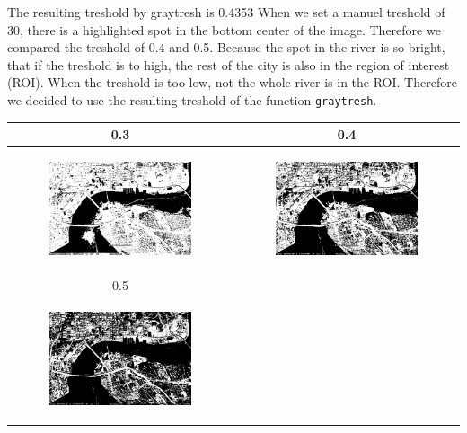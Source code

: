 \documentclass[11pt,a4paper]{scartcle}
\begin{document}
The resulting treshold by graytresh is 0.4353 When we set a manuel treshold of 30, there is a highlighted spot in the bottom center of the
image. Therefore we compared the treshold of 0.4 and 0.5. Because the spot in the river is so bright, that if the treshold is to high, the rest of the city is also in the region of interest (ROI). When
the treshold is too low, not the whole river is in the ROI. Therefore we decided to use the resulting treshold of the function \texttt{graytresh}.

\begin{tabular}{|c|c|}
	\hline
	0.3 &  0.4\\
	\hline
	\begin{figure}
		\centering
		\includegraphics[width=0.5\linewidth]{./img/treshold_0_30.jpg}
	\end{figure}
	&  \begin{figure}
		\centering
		\includegraphics[width=0.5\linewidth]{./img/treshold_0_40.jpg}
	\end{figure}\\
	\hline
	0.5 &  \\
	\hline
	\begin{figure}
		\centering
		\includegraphics[width=0.5\linewidth]{./img/treshold_0_50.jpg}
	\end{figure} &  \\
	\hline
\end{tabular}
\end{document}
